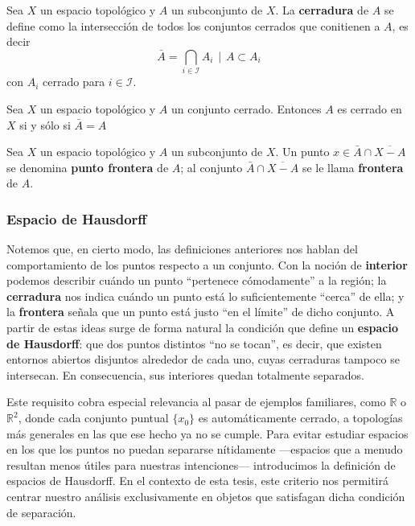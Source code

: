 \begin{definition}
    Sea $X$ un espacio topológico y $A$ un subconjunto de $X$.
    La \textbf{cerradura} de $A$ se define como la intersección de todos los conjuntos cerrados que conitienen a $A$, es decir \[
    \bar{A} = \displaystyle \bigcap_{i \in \mathcal{I}} A_i \hspace{5pt} | \hspace{5pt} A \subset A_i\] con $A_i$ cerrado para $i \in \mathcal{I}$.
\end{definition}
\begin{proposition}
    Sea $X$ un espacio topológico y $A$ un conjunto cerrado.
    Entonces $A$ es cerrado en $X$ si y sólo si $\bar{A} = A$
\end{proposition}

\begin{definition}
    Sea $X$ un espacio topológico y $A$ un subconjunto de $X$. Un punto $x \in \bar{A} \cap \overline{X-A} $ se denomina \textbf{punto frontera} de $A$; al conjunto  $\bar{A} \cap \overline{X-A}$ se le llama \textbf{frontera} de $A$.
    
\end{definition}

\subsubsection{Espacio de Hausdorff}

Notemos que, en cierto modo, las definiciones anteriores nos hablan del comportamiento de los puntos respecto a un conjunto. Con la noción de \textbf{interior} podemos describir cuándo un punto ``pertenece cómodamente'' a la región; la \textbf{cerradura} nos indica cuándo un punto está lo suficientemente ``cerca'' de ella; y la \textbf{frontera} señala que un punto está justo ``en el límite'' de dicho conjunto. A partir de estas ideas surge de forma natural la condición que define un \textbf{espacio de Hausdorff}: que dos puntos distintos ``no se tocan'', es decir, que existen entornos abiertos disjuntos alrededor de cada uno, cuyas cerraduras tampoco se intersecan. En consecuencia, sus interiores quedan totalmente separados.

Este requisito cobra especial relevancia al pasar de ejemplos familiares, como $\mathbb{R}$ o $\mathbb{R}^2$, donde cada conjunto puntual $\{x_0\}$ es automáticamente cerrado, a topologías más generales en las que ese hecho ya no se cumple. Para evitar estudiar espacios en los que los puntos no puedan separarse nítidamente ---espacios que a menudo resultan menos útiles para nuestras intenciones--- introducimos la definición de espacios de Hausdorff. En el contexto de esta tesis, este criterio nos permitirá centrar nuestro análisis exclusivamente en objetos que satisfagan dicha condición de separación.


